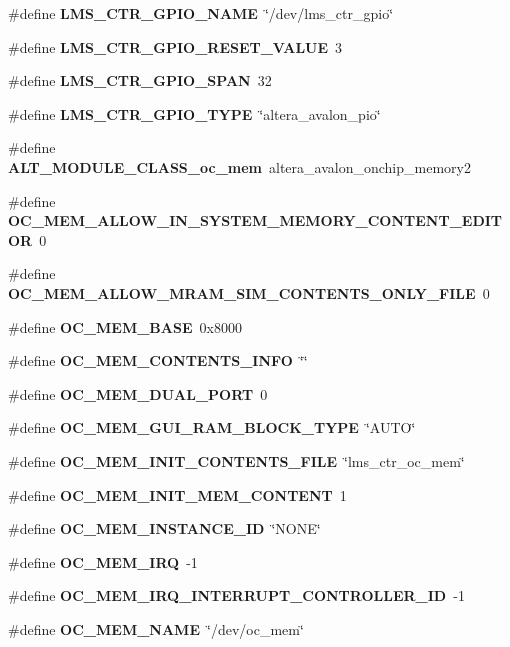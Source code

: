 \begin{DoxyCompactItemize}
\item 
\#define {\bf L\+M\+S\+\_\+\+C\+T\+R\+\_\+\+G\+P\+I\+O\+\_\+\+N\+A\+ME}~\char`\"{}/dev/lms\+\_\+ctr\+\_\+gpio\char`\"{}
\item 
\#define {\bf L\+M\+S\+\_\+\+C\+T\+R\+\_\+\+G\+P\+I\+O\+\_\+\+R\+E\+S\+E\+T\+\_\+\+V\+A\+L\+UE}~3
\item 
\#define {\bf L\+M\+S\+\_\+\+C\+T\+R\+\_\+\+G\+P\+I\+O\+\_\+\+S\+P\+AN}~32
\item 
\#define {\bf L\+M\+S\+\_\+\+C\+T\+R\+\_\+\+G\+P\+I\+O\+\_\+\+T\+Y\+PE}~\char`\"{}altera\+\_\+avalon\+\_\+pio\char`\"{}
\item 
\#define {\bf A\+L\+T\+\_\+\+M\+O\+D\+U\+L\+E\+\_\+\+C\+L\+A\+S\+S\+\_\+oc\+\_\+mem}~altera\+\_\+avalon\+\_\+onchip\+\_\+memory2
\item 
\#define {\bf O\+C\+\_\+\+M\+E\+M\+\_\+\+A\+L\+L\+O\+W\+\_\+\+I\+N\+\_\+\+S\+Y\+S\+T\+E\+M\+\_\+\+M\+E\+M\+O\+R\+Y\+\_\+\+C\+O\+N\+T\+E\+N\+T\+\_\+\+E\+D\+I\+T\+OR}~0
\item 
\#define {\bf O\+C\+\_\+\+M\+E\+M\+\_\+\+A\+L\+L\+O\+W\+\_\+\+M\+R\+A\+M\+\_\+\+S\+I\+M\+\_\+\+C\+O\+N\+T\+E\+N\+T\+S\+\_\+\+O\+N\+L\+Y\+\_\+\+F\+I\+LE}~0
\item 
\#define {\bf O\+C\+\_\+\+M\+E\+M\+\_\+\+B\+A\+SE}~0x8000
\item 
\#define {\bf O\+C\+\_\+\+M\+E\+M\+\_\+\+C\+O\+N\+T\+E\+N\+T\+S\+\_\+\+I\+N\+FO}~\char`\"{}\char`\"{}
\item 
\#define {\bf O\+C\+\_\+\+M\+E\+M\+\_\+\+D\+U\+A\+L\+\_\+\+P\+O\+RT}~0
\item 
\#define {\bf O\+C\+\_\+\+M\+E\+M\+\_\+\+G\+U\+I\+\_\+\+R\+A\+M\+\_\+\+B\+L\+O\+C\+K\+\_\+\+T\+Y\+PE}~\char`\"{}A\+U\+TO\char`\"{}
\item 
\#define {\bf O\+C\+\_\+\+M\+E\+M\+\_\+\+I\+N\+I\+T\+\_\+\+C\+O\+N\+T\+E\+N\+T\+S\+\_\+\+F\+I\+LE}~\char`\"{}lms\+\_\+ctr\+\_\+oc\+\_\+mem\char`\"{}
\item 
\#define {\bf O\+C\+\_\+\+M\+E\+M\+\_\+\+I\+N\+I\+T\+\_\+\+M\+E\+M\+\_\+\+C\+O\+N\+T\+E\+NT}~1
\item 
\#define {\bf O\+C\+\_\+\+M\+E\+M\+\_\+\+I\+N\+S\+T\+A\+N\+C\+E\+\_\+\+ID}~\char`\"{}N\+O\+NE\char`\"{}
\item 
\#define {\bf O\+C\+\_\+\+M\+E\+M\+\_\+\+I\+RQ}~-\/1
\item 
\#define {\bf O\+C\+\_\+\+M\+E\+M\+\_\+\+I\+R\+Q\+\_\+\+I\+N\+T\+E\+R\+R\+U\+P\+T\+\_\+\+C\+O\+N\+T\+R\+O\+L\+L\+E\+R\+\_\+\+ID}~-\/1
\item 
\#define {\bf O\+C\+\_\+\+M\+E\+M\+\_\+\+N\+A\+ME}~\char`\"{}/dev/oc\+\_\+mem\char`\"{}

\end{DoxyCompactItemize}
